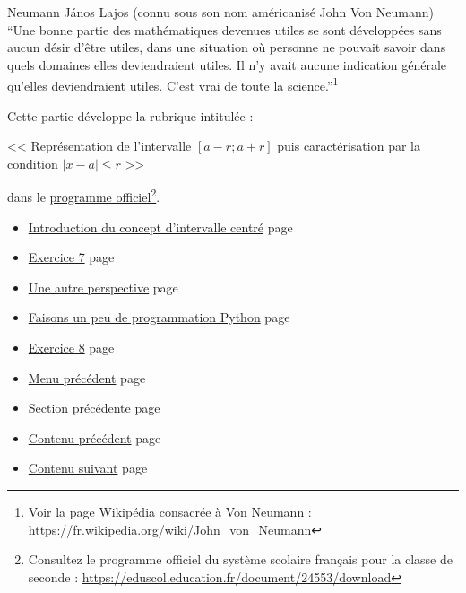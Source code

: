 \documentclass[a4paper,11pt]{book}
\begin{document}
\begin{myquote}{Neumann János Lajos (connu sous son nom américanisé John Von Neumann)}
\enquote{Une bonne partie des mathématiques devenues utiles se sont
développées sans aucun désir d'être utiles, dans une situation où
personne ne pouvait savoir dans quels domaines elles deviendraient
utiles. Il n'y avait aucune indication générale qu'elles
deviendraient utiles. C'est vrai de toute la science.}\footnote{Voir la page Wikipédia consacrée à Von Neumann : \url{https://fr.wikipedia.org/wiki/John_von_Neumann}}
\end{myquote}

\clearpage

Cette partie développe la rubrique intitulée :

<< Représentation de l'intervalle \([a - r ; a + r]\) puis
caractérisation par la condition \(\vert x - a \vert \leq r\) >>

dans le \href{https://eduscol.education.fr/document/24553/download}{programme officiel}\footnote{Consultez le programme officiel du système scolaire français
pour la classe de seconde :
\url{https://eduscol.education.fr/document/24553/download}}.

\clearpage

\label{orgb78d1c3}
\label{page:content4-menu}
\begin{itemize}
\item \hyperref[orgc8b3a2f]{Introduction du concept d'intervalle centré}
page~\pageref{page:sec2.4.1intro-disk}
\item \hyperref[org69ab718]{Exercice 7}
page~\pageref{page:sec2.4.2exo7}
\item \hyperref[org1f91479]{Une autre perspective}
page~\pageref{page:sec2.4.3persp}
\item \hyperref[orgac9e963]{Faisons un peu de programmation Python}
page~\pageref{page:sec2.4.4python}
\item \hyperref[org71eb39f]{Exercice 8}
page~\pageref{page:sec2.4.5exo8}
\item \hyperref[org2ce8f1f]{Menu précédent}
page~\pageref{page:content-menu}
\item \hyperref[org4ecd154]{Section précédente}
page~\pageref{page:sec2.3.3exo6}
\item \hyperref[org68323fe]{Contenu précédent}
page~\pageref{page:content3-menu}
\item \hyperref[org86f143d]{Contenu suivant}
page~\pageref{page:sec2.5content5}
\end{itemize}
\end{document}

